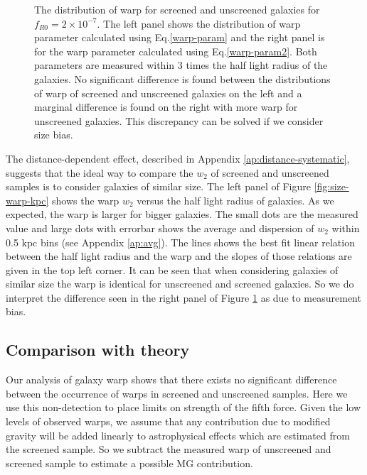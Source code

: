 \documentclass[useAMS,usenatbib,twocolumn]{mn2e}
\begin{document}
\begin{figure}
\begin{center}
\caption{ The distribution of warp for screened and unscreened galaxies for
$f_{R0} = 2\times10^{-7}$.
The left panel shows the distribution of warp parameter calculated using
Eq.\ref{warp-param} and the  right panel is for the warp parameter
calculated using Eq.\ref{warp-param2}. Both parameters are measured within 3
times the half light radius of the galaxies. No significant difference is found
between the distributions of warp of  screened and unscreened galaxies on
the left and a marginal difference is found on the right with more warp
for unscreened galaxies. This discrepancy can be solved if we consider size
bias.}
\label{fig:warp-distr}
\end{center}
\end{figure}





The distance-dependent effect, described in Appendix
\ref{ap:distance-systematic}, suggests that the ideal way to
compare the $w_2$ of screened and unscreened samples is to consider galaxies of
similar size. The left panel of Figure \ref{fig:size-warp-kpc} shows the
warp $w_2$ versus the half light radius of galaxies. As we expected, the
warp is larger for bigger galaxies. The small dots are
the measured value and large dots with errorbar shows the average and dispersion
of $w_2$ within 0.5 kpc bins (see Appendix \ref{ap:avg}).
The lines shows the best fit linear relation between the
half light radius and the warp and the slopes of those relations are given
in the top left corner. It can be seen that when considering galaxies of
similar size the warp is identical for unscreened and screened galaxies.
So we do interpret the difference seen in the right panel of Figure
\ref{fig:warp-distr} as due to measurement bias. 

\subsection{Comparison with theory}
Our analysis of galaxy warp shows that there exists no significant
difference between the occurrence of warps in screened and unscreened
samples. Here we use this non-detection to place 
limits on strength of the fifth force. Given the low levels of observed warps, 
we assume that any contribution 
due to modified gravity will be added linearly to astrophysical effects
which are estimated from the screened sample. 
So we subtract the measured warp of unscreened and screened 
sample to estimate a possible MG contribution. 
\end{document}
